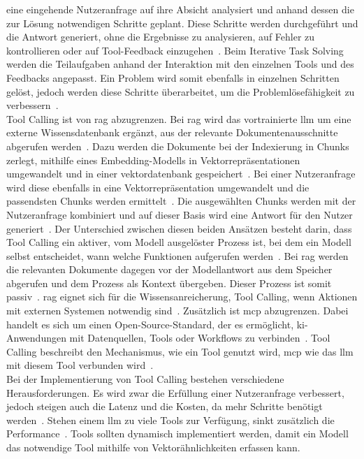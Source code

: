 eine eingehende Nutzeranfrage auf ihre Absicht analysiert und anhand dessen die zur Lösung notwendigen Schritte geplant. 
Diese Schritte werden durchgeführt und die Antwort generiert, ohne die Ergebnisse zu analysieren, auf Fehler zu kontrollieren oder auf Tool-Feedback einzugehen~\cite[9]{tc10}. 
Beim Iterative Task Solving werden die Teilaufgaben anhand der Interaktion mit den einzelnen Tools und des Feedbacks angepasst. Ein Problem wird
somit ebenfalls in einzelnen Schritten gelöst, jedoch werden diese Schritte überarbeitet, um die Problemlösefähigkeit zu verbessern~\cite[9]{tc10}. \\
Tool Calling ist von \acf{rag} abzugrenzen. Bei \ac{rag} wird das vortrainierte \ac{llm} um eine externe Wissensdatenbank ergänzt, aus der relevante Dokumentenausschnitte
abgerufen werden~\cite[1]{rag04}. Dazu werden die Dokumente bei der Indexierung in Chunks zerlegt, mithilfe eines Embedding-Modells in Vektorrepräsentationen
umgewandelt und in einer \gls{vektordatenbank} gespeichert~\cite[3]{rag04}. Bei einer Nutzeranfrage wird diese ebenfalls in eine Vektorrepräsentation umgewandelt
und die passendsten Chunks werden ermittelt~\cite[3]{rag04}. Die ausgewählten Chunks werden mit der Nutzeranfrage kombiniert und auf dieser Basis wird eine Antwort
für den Nutzer generiert~\cite[3]{rag04}. Der Unterschied zwischen diesen beiden Ansätzen besteht darin, dass Tool Calling ein aktiver, vom Modell ausgelöster 
Prozess ist, bei dem ein Modell selbst entscheidet, wann welche Funktionen aufgerufen werden~\cite{tc07}. Bei \ac{rag} werden die relevanten
Dokumente dagegen vor der Modellantwort aus dem Speicher abgerufen und dem Prozess als Kontext übergeben. Dieser Prozess ist somit passiv~\cite{tc07}. \ac{rag} 
eignet sich für die Wissensanreicherung, Tool Calling, wenn Aktionen mit externen Systemen notwendig sind~\cite{tc07}. Zusätzlich ist \ac{mcp} abzugrenzen. 
Dabei handelt es sich um einen Open-Source-Standard, der es ermöglicht, \ac{ki}-Anwendungen mit Datenquellen, Tools oder Workflows zu verbinden~\cite{tc13}. Tool Calling 
beschreibt den Mechanismus, wie ein Tool genutzt wird, \ac{mcp} wie das \ac{llm} mit diesem Tool verbunden wird~\cite{tc05}. \\
Bei der Implementierung von Tool Calling bestehen verschiedene Herausforderungen. Es wird zwar die Erfüllung einer Nutzeranfrage verbessert, jedoch steigen
auch die Latenz und die Kosten, da mehr Schritte benötigt werden~\cite[17776]{tc08}. Stehen einem \ac{llm} zu viele Tools zur Verfügung, sinkt zusätzlich die
Performance~\cite{tc03}. Tools sollten dynamisch implementiert werden, damit ein Modell das notwendige Tool mithilfe von Vektorähnlichkeiten erfassen kann.
